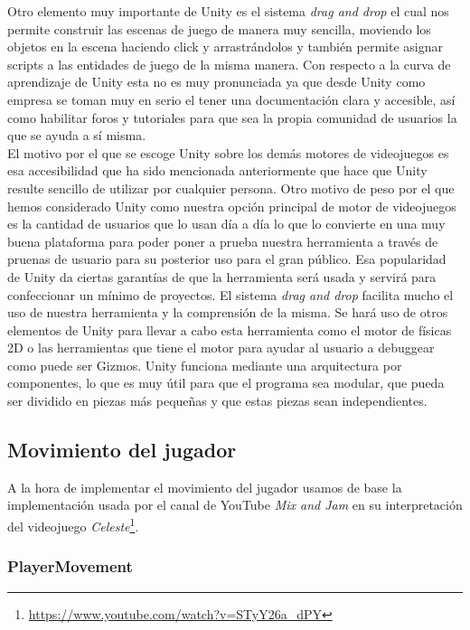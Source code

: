 Otro elemento muy importante de Unity es el sistema \textit{drag and drop} el cual nos permite construir las escenas de juego de manera muy sencilla, moviendo los objetos en la escena haciendo click y arrastrándolos y también permite asignar scripts a las entidades de juego de la misma manera. Con respecto a la curva de aprendizaje de Unity esta no es muy pronunciada ya que desde Unity como empresa se toman muy en serio el tener una documentación clara y accesible, así como habilitar foros y tutoriales para que sea la propia comunidad de usuarios la que se ayuda a sí misma.\\


El motivo por el que se escoge Unity sobre los demás motores de videojuegos es esa accesibilidad que ha sido mencionada anteriormente que hace que Unity resulte sencillo de utilizar por cualquier persona. Otro motivo de peso por el que hemos considerado Unity como nuestra opción principal de motor de videojuegos es la cantidad de usuarios que lo usan día a día lo que lo convierte en una muy buena plataforma para poder poner a prueba nuestra herramienta a través de pruenas de usuario para su posterior uso para el gran público. Esa popularidad de Unity da ciertas garantías de que la herramienta será usada y servirá para confeccionar un mínimo de proyectos.
El sistema \textit{drag and drop} facilita mucho el uso de nuestra herramienta y la comprensión de la misma.
Se hará uso de otros elementos de Unity para llevar a cabo esta herramienta como el motor de físicas 2D o las herramientas que tiene el motor para ayudar al usuario a debuggear como puede ser Gizmos.
Unity funciona mediante una arquitectura por componentes, lo que es muy útil para que el programa sea modular, que pueda ser dividido en piezas más pequeñas y que estas piezas sean independientes.\\

\subsection{Movimiento del jugador}

A la hora de implementar el movimiento del jugador usamos de base la implementación usada por el canal de YouTube \textit{Mix and Jam} en su interpretación del videojuego \textit{Celeste}\footnote{\url{https://www.youtube.com/watch?v=STyY26a_dPY}}.


\subsubsection{PlayerMovement}

